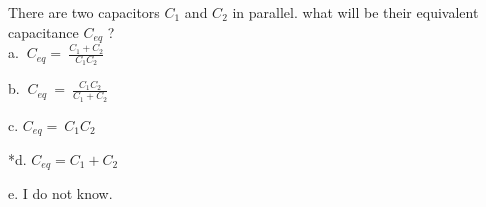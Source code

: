 
There are two capacitors \( C_{1} \) and \( C_{2} \) in
parallel. what will be their equivalent capacitance \( C_{eq} \) ?\\

a. \(\ C_{eq} = \ \frac{ C_{1} + C_{2} }{ C_{1}C_{2} } \)

b. \(\ C_{eq}\  = \ \frac{ C_{1}C_{2} }{ C_{1} + C_{2} } \)

c. \( C_{eq} = \ C_{1}C_{2} \)

*d. \( C_{eq} = C_{1} + C_{2} \)

e. I do not know.\\
